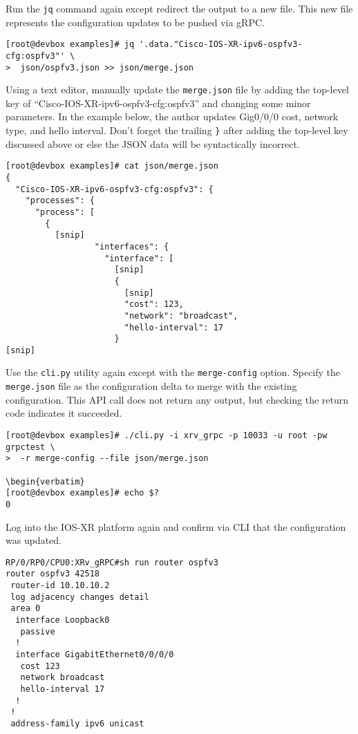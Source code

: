 Run the \verb|jq| command again except redirect the output to a new file. This new
file represents the configuration updates to be pushed via gRPC\@.

\begin{verbatim}
[root@devbox examples]# jq '.data."Cisco-IOS-XR-ipv6-ospfv3-cfg:ospfv3"' \
>  json/ospfv3.json >> json/merge.json
\end{verbatim}

Using a text editor, manually update the \verb|merge.json| file by adding the
top-level key of ``Cisco-IOS-XR-ipv6-ospfv3-cfg:ospfv3'' and changing some
minor parameters. In the example below, the author updates Gig0/0/0 cost,
network type, and hello interval. Don't forget the trailing \verb|}| after
adding the top-level key discussed above or else the JSON data will be
syntactically incorrect.

\begin{verbatim}
[root@devbox examples]# cat json/merge.json 
{
  "Cisco-IOS-XR-ipv6-ospfv3-cfg:ospfv3": {
    "processes": {
      "process": [
        {
          [snip]
                  "interfaces": {
                    "interface": [
                      [snip]
                      {
                        [snip]
                        "cost": 123,
                        "network": "broadcast",
                        "hello-interval": 17
                      }
[snip]
\end{verbatim}

Use the \verb|cli.py| utility again except with the \verb|merge-config|
option. Specify the \verb|merge.json| file as the configuration delta to merge
with the existing configuration. This API call does not return any output, but
checking the return code indicates it succeeded.

\begin{verbatim}
[root@devbox examples]# ./cli.py -i xrv_grpc -p 10033 -u root -pw grpctest \
>  -r merge-config --file json/merge.json

\begin{verbatim}
[root@devbox examples]# echo $?
0
\end{verbatim}

Log into the IOS-XR platform again and confirm via CLI that the configuration was updated.

\begin{verbatim}
RP/0/RP0/CPU0:XRv_gRPC#sh run router ospfv3
router ospfv3 42518
 router-id 10.10.10.2
 log adjacency changes detail
 area 0
  interface Loopback0
   passive
  !
  interface GigabitEthernet0/0/0/0
   cost 123
   network broadcast
   hello-interval 17
  !
 !
 address-family ipv6 unicast
\end{verbatim}

